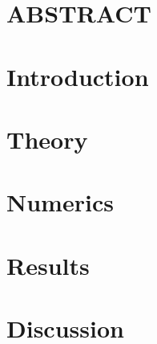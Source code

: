 \documentclass{article}
\begin{document}

\thispagestyle{empty}
\newpage
\thispagestyle{plain}

\newpage
\thispagestyle{plain}
\section*{ABSTRACT}

\thispagestyle{empty}
\newpage
\tableofcontents
\newpage
{}



\newpage
\section{Introduction}

\newpage
\section{Theory}

\newpage
\section{Numerics}

\newpage
\section{Results}

\newpage
\section{Discussion}


\newpage
\printbibliography
\end{document}
